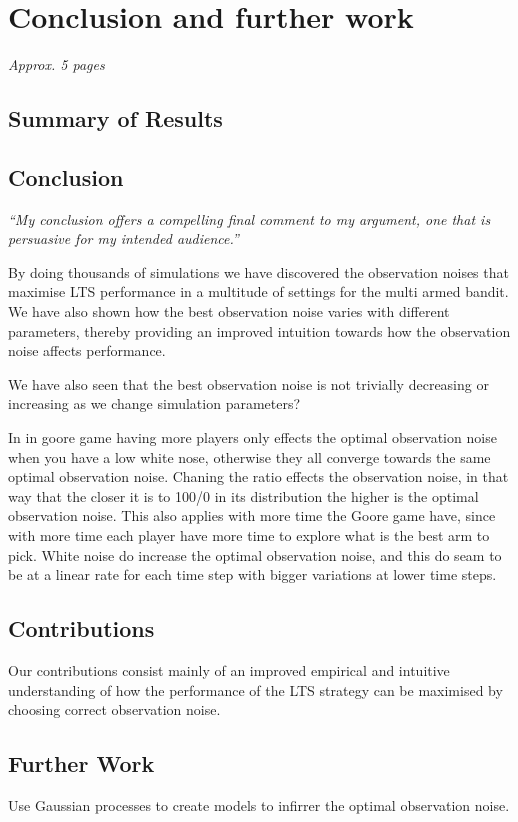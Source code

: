 \chapter{Conclusion and further work}
\label{ch:conclusion}
\textit{Approx. 5 pages}

\section{Summary of Results}

\section{Conclusion}
\emph{“My conclusion offers a compelling final comment to my argument, one that is persuasive for my intended audience.”}

By doing thousands of simulations we have discovered the observation noises that maximise LTS performance in a multitude of settings for the multi armed bandit.
We have also shown how the best observation noise varies with different parameters, thereby providing an improved intuition towards how the observation noise affects performance.

We have also seen that the best observation noise is not trivially decreasing or increasing as we change simulation parameters?

In in goore game having more players only effects the optimal observation noise when you have a low white nose,
otherwise they all converge towards the same optimal observation noise. Chaning the ratio effects the observation
noise, in that way that the closer it is to 100/0 in its distribution the higher is the optimal observation noise.
This also applies with more time the Goore game have, since with more time each player have more time to explore
what is the best arm to pick. White noise do increase the optimal observation noise, and this do seam to be at a
linear rate for each time step with bigger variations at lower time steps.

\section{Contributions}
Our contributions consist mainly of an improved empirical and intuitive understanding of how the performance of the LTS strategy can be maximised by choosing correct observation noise.


\section{Further Work}
Use Gaussian processes to create models to infirrer the optimal observation noise.

